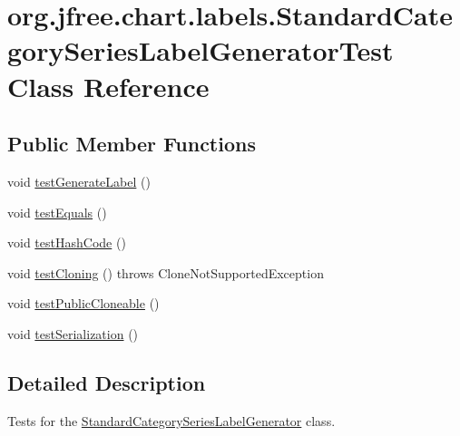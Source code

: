 \hypertarget{classorg_1_1jfree_1_1chart_1_1labels_1_1_standard_category_series_label_generator_test}{}\section{org.\+jfree.\+chart.\+labels.\+Standard\+Category\+Series\+Label\+Generator\+Test Class Reference}
\label{classorg_1_1jfree_1_1chart_1_1labels_1_1_standard_category_series_label_generator_test}
\subsection*{Public Member Functions}
\begin{DoxyCompactItemize}
\item 
void \mbox{\hyperlink{classorg_1_1jfree_1_1chart_1_1labels_1_1_standard_category_series_label_generator_test_a759430e763d1e0eb86a6bd82fe280384}{test\+Generate\+Label}} ()
\item 
void \mbox{\hyperlink{classorg_1_1jfree_1_1chart_1_1labels_1_1_standard_category_series_label_generator_test_aecd17c7a46c13dee3bdc2ddbd8ba9d4e}{test\+Equals}} ()
\item 
void \mbox{\hyperlink{classorg_1_1jfree_1_1chart_1_1labels_1_1_standard_category_series_label_generator_test_a64679d3504833789eda5766915e447d2}{test\+Hash\+Code}} ()
\item 
void \mbox{\hyperlink{classorg_1_1jfree_1_1chart_1_1labels_1_1_standard_category_series_label_generator_test_ad246fc82068177cde99451e2e648896f}{test\+Cloning}} ()  throws Clone\+Not\+Supported\+Exception 
\item 
void \mbox{\hyperlink{classorg_1_1jfree_1_1chart_1_1labels_1_1_standard_category_series_label_generator_test_ad4b565f6da91ce58005b9de2207c60c7}{test\+Public\+Cloneable}} ()
\item 
void \mbox{\hyperlink{classorg_1_1jfree_1_1chart_1_1labels_1_1_standard_category_series_label_generator_test_a73ef08a2d1798f1b237c16c55a8c4d11}{test\+Serialization}} ()
\end{DoxyCompactItemize}


\subsection{Detailed Description}
Tests for the \mbox{\hyperlink{classorg_1_1jfree_1_1chart_1_1labels_1_1_standard_category_series_label_generator}{Standard\+Category\+Series\+Label\+Generator}} class. 

